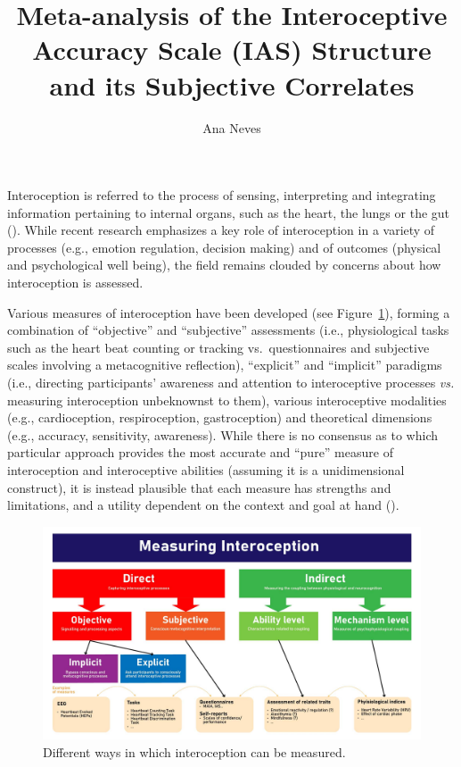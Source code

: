 \documentclass[
  man,
  floatsintext,
  longtable,
  nolmodern,
  notxfonts,
  notimes,
  colorlinks=true,linkcolor=blue,citecolor=blue,urlcolor=blue]{apa7}
\title{Meta-analysis of the Interoceptive Accuracy Scale (IAS) Structure
and its Subjective Correlates}
\author{Ana Neves}
\affiliation{
{School of Psychology, University of Sussex}}
\begin{document}
\maketitle


\setcounter{secnumdepth}{-\maxdimen} %

\setlength\LTleft{0pt}

\resetlinenumber[1]

Interoception is referred to the process of sensing, interpreting and
integrating information pertaining to internal organs, such as the
heart, the lungs or the gut (). While recent research emphasizes a key
role of interoception in a variety of processes (e.g., emotion
regulation, decision making) and of outcomes (physical and psychological
well being), the field remains clouded by concerns about how
interoception is assessed.

Various measures of interoception have been developed (see
Figure~\ref{fig-measures}), forming a combination of ``objective'' and
``subjective'' assessments (i.e., physiological tasks such as the heart
beat counting or tracking vs.~questionnaires and subjective scales
involving a metacognitive reflection), ``explicit'' and ``implicit''
paradigms (i.e., directing participants' awareness and attention to
interoceptive processes \emph{vs.} measuring interoception unbeknownst
to them), various interoceptive modalities (e.g., cardioception,
respiroception, gastroception) and theoretical dimensions (e.g.,
accuracy, sensitivity, awareness). While there is no consensus as to
which particular approach provides the most accurate and ``pure''
measure of interoception and interoceptive abilities (assuming it is a
unidimensional construct), it is instead plausible that each measure has
strengths and limitations, and a utility dependent on the context and
goal at hand ().

\begin{figure}[!htbp]

{\caption{{Different ways in which interoception can be
measured.}{\label{fig-measures}}}}

\includegraphics[width=6.4in,height=\textheight,keepaspectratio]{figures/MeasuringInteroception.jpg}

\end{figure}
\end{document}
